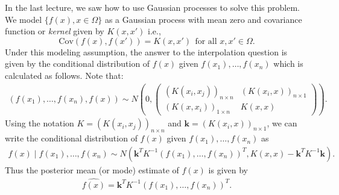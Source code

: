 \documentclass{scrartcl}
\begin{document}
In the last lecture, we saw how to use Gaussian processes to solve
this problem. We model $\{f(x), x \in 
\Omega\}$ as a Gaussian process with mean zero and covariance
function or \textit{kernel} given by $K(x, x')$ i.e.,
\begin{equation*}
  \text{Cov}(f(x), f(x')) = K(x, x') ~~\text{for all $x, x' \in
    \Omega$}. 
\end{equation*}
Under this modeling assumption, the answer to the interpolation
question is given by the conditional distribution of $f(x)$ given
$f(x_1), \dots, f(x_n)$ which is calculated as follows.
Note that:
\begin{align*}
  (f(x_1), \dots, f(x_n), f(x)) \sim N \left(0, \begin{pmatrix} (K(x_i, 
                                             x_j))_{n \times n}  & (K(x_i,
                                                            x))_{n
                                                            \times 1}
                                             \\ (K(x, x_i))_{1
                                             \times n} & K(x,
                                                         x) \end{pmatrix}
  \right). 
\end{align*}
Using the notation $K = (K(x_i, 
                                             x_j))_{n \times n}$ and
                                             $\mathbf{k} = (K(x_i,
                                                            x))_{n
                                                            \times
                                                            1}$, we
                                                          can write
                                                          the
                                                          conditional
                                                          distribution
                                                          of
                                                          $f(x)$
                                                          given $f(x_1),
                                                          \dots, 
f(x_n)$ as
\begin{align*}
  f(x) \mid f(x_1), \dots, f(x_n) \sim N\left(\mathbf{k}^TK^{-1} (f(x_1), \dots,
  f(x_n))^T, K(x, x) -
  \mathbf{k}^T K^{-1} \mathbf{k} \right).
\end{align*}
Thus the posterior mean (or mode) estimate of $f(x)$ is given by
\begin{align}\label{posmean_int}
  \widehat{f(x)} = \mathbf{k}^TK^{-1} (f(x_1), \dots, f(x_n))^T. 
\end{align}
\end{document}
